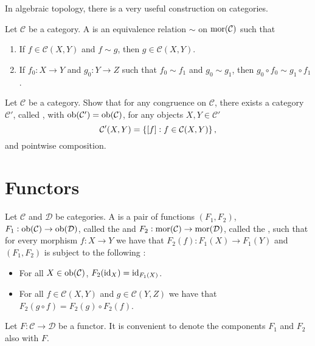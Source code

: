 In algebraic topology, there is a very useful construction on categories.

\begin{definition}[Congruence]
	Let $\mathcal{C}$ be a category. A  is an equivalence relation $\sim$ on $\operatorname{mor}(\mathcal{C})$ such that 
	\begin{enumerate}[label = \textup{(}\alph*\textup{)},wide = 0pt]
		\item If $f \in \mathcal{C}(X,Y)$ and $f {\sim} g$, then $g \in \mathcal{C}(X,Y)$.
		\item If $f_0 : X \to Y$ and $g_0 : Y \to Z$ such that $f_0 {\sim} f_1$ and $g_0 {\sim} g_1$, then $g_0 \circ f_0 {\sim} g_1 \circ f_1$.
	\end{enumerate}
\end{definition}

\begin{exercise}
	Let $\mathcal{C}$ be a category. Show that for any congruence on $\mathcal{C}$, there exists a category $\mathcal{C}'$, called , with $\operatorname{ob}(\mathcal{C}') = \operatorname{ob}(\mathcal{C})$, for any objects $X,Y \in \mathcal{C}'$
	\begin{equation*}
		\mathcal{C}'(X,Y) = \cbr[0]{\sbr[0]{f} : f \in \mathcal{C}(X,Y)},
	\end{equation*}
	\noindent and pointwise composition.
\end{exercise}

\section*{Functors}

\begin{definition}[Functor]
	Let $\mathcal{C}$ and $\mathcal{D}$ be categories. A  is a pair of functions $(F_1,F_2)$, $F_1 : \operatorname{ob}(\mathcal{C}) \to \operatorname{ob}(\mathcal{D})$, called the  and $F_2 : \operatorname{mor}(\mathcal{C}) \to \operatorname{mor}(\mathcal{D})$, called the , such that for every morphism $f : X \to Y$ we have that $F_2(f) : F_1(X) \to F_1(Y)$ and $(F_1,F_2)$ is subject to the following :
	\begin{itemize}[leftmargin = *]
		\item For all $X \in \operatorname{ob}(\mathcal{C})$, $F_2(\operatorname{id}_X) = \operatorname{id}_{F_1(X)}$.
		\item For all $f \in \mathcal{C}(X,Y)$ and $g \in \mathcal{C}(Y,Z)$ we have that $F_2(g \circ f) = F_2(g) \circ F_2(f)$.
	\end{itemize}
\end{definition}

\begin{remark}
	Let $F : \mathcal{C} \to \mathcal{D}$ be a functor. It is convenient to denote the components $F_1$ and $F_2$ also with $F$.
\end{remark}
